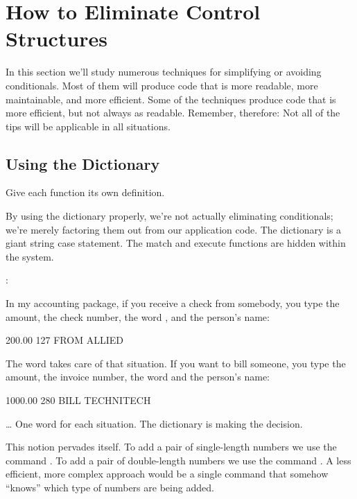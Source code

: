 \section{How to Eliminate Control Structures}

In this section we'll study numerous techniques for simplifying or
avoiding conditionals. Most of them will produce code that is more
readable, more maintainable, and more efficient. Some of the techniques
produce code that is more efficient, but not always as readable.
Remember, therefore: Not all of the tips will be applicable in all
situations.

\subsection{Using the Dictionary}%
%

\begin{tip}
Give each function its own definition.
\end{tip}
By using the \Forth{} dictionary properly, we're not actually eliminating
conditionals; we're merely factoring them out from our application code.
The \Forth{} dictionary is a giant string case statement. The match and
execute functions are hidden within the \Forth{} system.

\begin{interview}
:
\begin{tfquot}
In my accounting package, if you receive a check from somebody, you type
the amount, the check number, the word , and the person's
name:

\begin{Code}
200.00 127 FROM ALLIED
\end{Code}
The word  takes care of that situation. If you want to bill
someone, you type the amount, the invoice number, the word 
and the person's name:

\begin{Code}
1000.00 280 BILL TECHNITECH
\end{Code}
\end{tfquot}
\dots{} One word for each situation. The dictionary is making the decision.\medskip
\end{interview}
This notion pervades \Forth{} itself. To add a pair of single-length
numbers we use the command \forth{+}. To add a pair of double-length
numbers we use the command . A less efficient, more complex
approach would be a single command that somehow ``knows'' which type of
numbers are being added.

